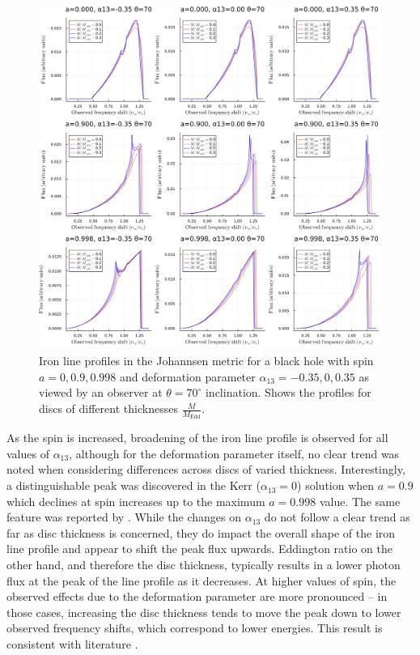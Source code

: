 \documentclass[fleqn,usenatbib,useAMS]{mnras}
\begin{document}
\begin{figure}[h!]
    \centering
    \includegraphics[width=\linewidth]{figures/abdi70.png}
    \caption{Iron line profiles in the Johannsen metric for a black hole with spin $a = 0, 0.9, 0.998$ and deformation parameter $\alpha_{13} = -0.35, 0, 0.35$ as viewed by an observer at $\theta = 70^{\circ}$ inclination. Shows the profiles for discs of different thicknesses $\frac{\dot M}{M_{\text{Edd}}}$.}
    \label{abdi70}
\end{figure}

As the spin is increased, broadening of the iron line profile is observed for all values of $\alpha_{13}$, although for the deformation parameter itself, no clear trend was noted when considering differences across discs of varied thickness. Interestingly, a distinguishable peak was discovered in the Kerr ($\alpha_{13} = 0$) solution when $a = 0.9$ which declines at spin increases up to the maximum $a = 0.998$ value. The same feature was reported by \cite{abdikamalov2020testing}. While the changes on $\alpha_{13}$ do not follow a clear trend as far as disc thickness is concerned, they do impact the overall shape of the iron line profile and appear to shift the peak flux upwards. Eddington ratio on the other hand, and therefore the disc thickness, typically results in a lower photon flux at the peak of the line profile as it decreases. At higher values of spin, the observed effects due to the deformation parameter are more pronounced -- in those cases, increasing the disc thickness tends to move the peak down to lower observed frequency shifts, which correspond to lower energies. This result is consistent with literature \cite{abdikamalov2020testing}.
\end{document}
